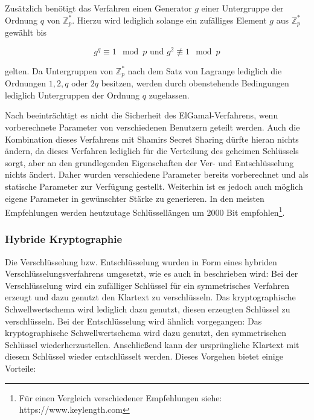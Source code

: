   Zusätzlich benötigt das Verfahren einen Generator \(g\) einer Untergruppe der Ordnung \(q\) von \(\mathbb{Z}_p^*\). Hierzu wird lediglich solange ein zufälliges Element \(g\) aus \(\mathbb{Z}_p^*\) gewählt bis 
  
  \[g^q \equiv 1 \mod p \text{ und } g^2 \not\equiv 1 \mod p\] 
  
  gelten. Da Untergruppen von \(\mathbb{Z}_p^*\) nach dem Satz von Lagrange lediglich die Ordnungen \(1, 2, q\) oder \(2q\) besitzen, werden durch obenstehende Bedingungen lediglich Untergruppen der Ordnung \(q\) zugelassen.
  
  Nach \cite{katz2014} beeinträchtigt es nicht die Sicherheit des ElGamal-Verfahrens, wenn vorberechnete Parameter von verschiedenen Benutzern geteilt werden. Auch die Kombination dieses Verfahrens mit Shamirs Secret Sharing dürfte hieran nichts ändern, da dieses Verfahren lediglich für die Verteilung des geheimen Schlüssels sorgt, aber an den grundlegenden Eigenschaften der Ver- und Entschlüsselung nichts ändert. Daher wurden verschiedene Parameter bereits vorberechnet und als statische Parameter zur Verfügung gestellt. Weiterhin ist es jedoch auch möglich eigene Parameter in gewünschter Stärke zu generieren.  In den meisten Empfehlungen werden heutzutage Schlüssellängen um 2000 Bit empfohlen\footnote{
    Für einen Vergleich verschiedener Empfehlungen siehe: https://www.keylength.com
  }.
  
  \subsubsection{Hybride Kryptographie}
  
  \label{sec_impl_threshold_hybrid}
  
%  
%  

  Die Verschlüsselung bzw. Entschlüsselung wurden in Form eines hybriden Verschlüsselungsverfahrens umgesetzt, wie es auch in \cite{katz2014} beschrieben wird: Bei der Verschlüsselung wird ein zufälliger Schlüssel für ein symmetrisches Verfahren erzeugt und dazu genutzt den Klartext zu verschlüsseln. Das kryptographische Schwellwertschema wird lediglich dazu genutzt, diesen erzeugten Schlüssel zu verschlüsseln. Bei der Entschlüsselung wird ähnlich vorgegangen: Das kryptographische Schwellwertschema wird dazu genutzt, den symmetrischen Schlüssel wiederherzustellen. Anschließend kann der ursprüngliche Klartext mit diesem Schlüssel wieder entschlüsselt werden.  Dieses Vorgehen bietet einige Vorteile: 
  
